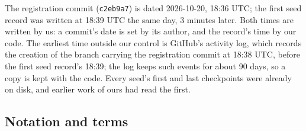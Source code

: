 \documentclass[11pt]{article}
\begin{document}
The registration commit (\texttt{c2eb9a7}) is dated 2026-10-20, 18:36 UTC; the first seed record was written at 18:39 UTC the same day, 3 minutes later. Both times are written by us: a commit's date is set by its author, and the record's time by our code. The earliest time outside our control is GitHub's activity log, which records the creation of the branch carrying the registration commit at 18:38 UTC, before the first seed record's 18:39; the log keeps such events for about 90 days, so a copy is kept with the code. Every seed's first and last checkpoints were already on disk, and earlier work of ours had read the first.

\subsection{Notation and terms}\label{sec:3.5}
\end{document}
